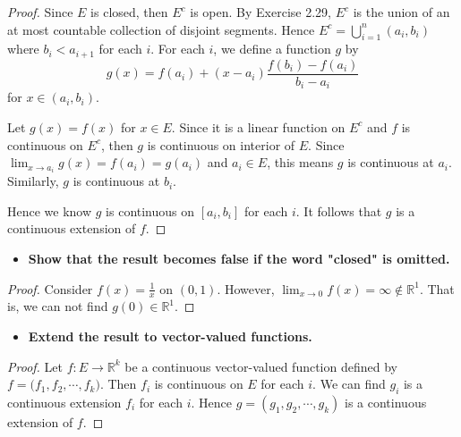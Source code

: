 \begin{Exercise}
	\begin{proof}
		Since $E$ is closed, then $E^c$ is open.
		By Exercise 2.29, $E^c$ is the union of an at most countable collection of disjoint segments.
		Hence $E^c = \bigcup_{i=1}^{n}(a_i,b_i)$ where $b_i < a_{i+1}$ for each $i$.
		For each $i$, we define a function $g$ by
		$$
		g(x) = f(a_i) + (x-a_i)\frac{f(b_i)-f(a_i)}{b_i-a_i}
		$$
		for $x\in(a_i,b_i)$.
		
		Let $g(x) = f(x)$ for $x\in E$.
		Since it is a linear function on $E^c$ and $f$ is continuous on $E^c$, then $g$ is continuous on interior of $E$.
		Since $\lim_{x\to a_i} g(x) = f(a_i) = g(a_i)$ and $a_i\in E$, this means $g$ is continuous at $a_i$.
		Similarly, $g$ is continuous at $b_i$.
		
		Hence we know $g$ is continuous on $[a_i,b_i]$ for each $i$.
		It follows that $g$ is a continuous extension of $f$.
	\end{proof}
	
	\begin{itemize}
		\item \textbf{Show that the result becomes false if the word "closed" is omitted.}
	\end{itemize}
	\begin{proof}
		Consider $f(x) = \frac{1}{x}$ on $(0,1)$.
		However, $\lim_{x\to 0}f(x) = \infty \notin \mathbb{R}^1$.
		That is, we can not find $g(0)\in \mathbb{R}^1$.
	\end{proof}
	
	\begin{itemize}
		\item \textbf{Extend the result to vector-valued functions.}
	\end{itemize}
	\begin{proof}
		Let $f:E\to\mathbb{R}^k$ be a continuous vector-valued function defined by $f = \big( f_1, f_2, \cdots, f_k)$.
		Then $f_i$ is continuous on $E$ for each $i$.
		We can find $g_i$ is a continuous extension $f_i$ for each $i$.
		Hence $g = (g_1,g_2,\cdots,g_k)$ is a continuous extension of $f$.
	\end{proof}
\end{Exercise}